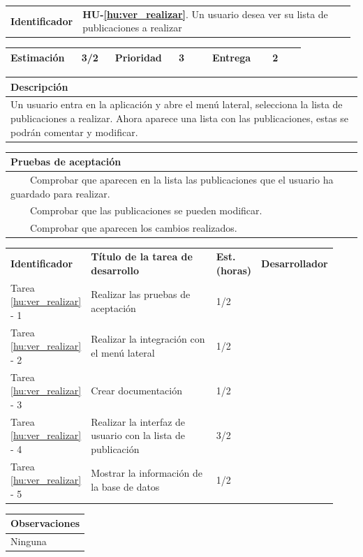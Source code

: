 \documentclass[11pt]{article}
\newcommand{\tabitem}{~~\llap{\textbullet}~~}
\begin{document}
\begin{longtable}{p{0.18\linewidth}|p{0.8\linewidth}}
  \rowcolor{LightCyan}
  \textbf{Identificador} & \textbf{HU-\ref{hu:ver_realizar}}. Un usuario desea ver su lista de publicaciones a realizar \\  
\end{longtable}
\vspace{-0.8cm}
\begin{longtable}{p{0.18\linewidth}|p{0.1\linewidth}|p{0.18\linewidth}|p{0.1\linewidth}|p{0.18\linewidth}|p{0.1\linewidth}}
  \toprule
  \textbf{Estimación} & 3/2 & \textbf{Prioridad} & 3 & \textbf{Entrega} & 2 \\
  \bottomrule
\end{longtable}
\vspace{-0.8cm}
\begin{longtable}{p{1.028\linewidth}}
  \textbf{Descripción}\\
  \midrule
  Un usuario entra en la aplicación y abre el menú lateral, selecciona la lista de publicaciones a realizar. Ahora aparece una lista con las publicaciones, estas se podrán comentar y modificar. \\
  \bottomrule
\end{longtable}
\vspace{-0.8cm}
\begin{longtable}{p{1.028\linewidth}}
  \textbf{Pruebas de aceptación}\\
  \midrule
  \tabitem Comprobar que aparecen en la lista las publicaciones que el usuario ha guardado para realizar. \\
  \tabitem Comprobar que las publicaciones se pueden modificar. \\
  \tabitem Comprobar que aparecen los cambios realizados.\\
\end{longtable}
\vspace{-0.8cm}
\begin{longtable}{p{0.18\linewidth}|p{0.48\linewidth}|p{0.1\linewidth}|p{0.17\linewidth}}
  \toprule
  \textbf{Identificador} & \textbf{Título de la tarea de desarrollo} & \textbf{Est. (horas)} & \textbf{Desarrollador} \\
  Tarea \ref{hu:ver_realizar} - 1 & Realizar las pruebas de aceptación & 1/2 &\\
  Tarea \ref{hu:ver_realizar} - 2 & Realizar la integración con el menú lateral & 1/2 & \\
  Tarea \ref{hu:ver_realizar} - 3 & Crear documentación & 1/2 & \\
  Tarea \ref{hu:ver_realizar} - 4 & Realizar la interfaz de usuario con la lista de publicación & 3/2 &  \\
  Tarea \ref{hu:ver_realizar} - 5 & Mostrar la información de la base de datos & 1/2 &  \\
  \bottomrule
\end{longtable}
\vspace{-0.8cm}
\begin{longtable}{p{1.028\linewidth}}
  \textbf{Observaciones}\\
  \midrule
  Ninguna\\
  \bottomrule
\end{longtable}
\end{document}
